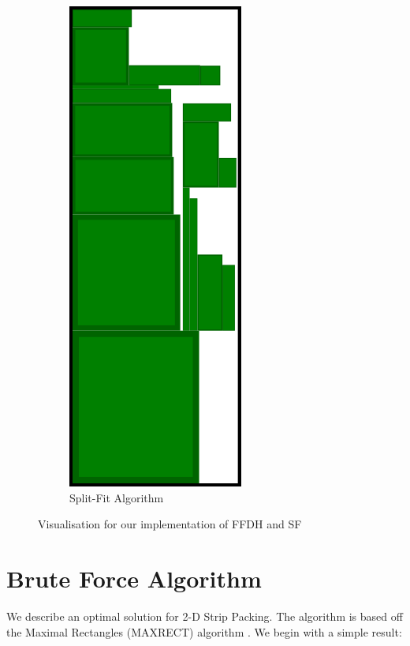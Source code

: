 \documentclass{article}
\begin{document}
\begin{figure}[ht]
\begin{subfigure}{.35\textwidth}
  \includegraphics[width=.5\linewidth]{SplitFitrun.png}
  \caption{Split-Fit Algorithm}
  \label{fig:splitfitrun}
\end{subfigure}
  \caption{Visualisation for our implementation of FFDH and SF}
  \label{fig:ffdhsfrun}
\end{figure}

\section{Brute Force Algorithm}
We describe an optimal solution for 2-D Strip Packing. The algorithm is based off the Maximal Rectangles (MAXRECT) algorithm \cite{rectanglebinpack}. We begin with a simple result:
\end{document}
